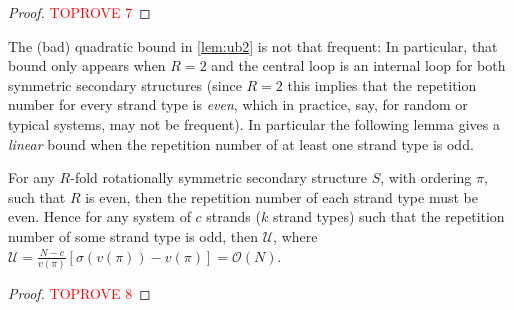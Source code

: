 \begin{proof}\textcolor{red}{TOPROVE 7}\end{proof}

The (bad) quadratic bound in \cref{lem:ub2} is not that frequent: 
In particular, that bound only appears when $R=2$ and the central loop is an internal loop for both symmetric secondary structures (since $R=2$ this implies that the repetition number for every strand type is {\em even}, which in practice, say, for random or typical systems, may not be frequent).   
In particular the following lemma gives a {\em linear} bound when the repetition number of at least one strand type is odd. 


\begin{lemma} \label{lem:even}
	For any $R$-fold rotationally symmetric  secondary structure $S$, with ordering $\pi$, such that $R$ is even, then the repetition number of each strand type must be even. Hence for any system of $c$ strands ($k$ strand types) such that the repetition number of some strand type is odd, then $\mathcal{U}$, where $\mathcal{U} =  \frac{N-c}{v(\pi)} \left[ \sigma(v(\pi))-v(\pi) \right] = \mathcal{O}(N)$. 
\end{lemma}
\begin{proof}\textcolor{red}{TOPROVE 8}\end{proof}




